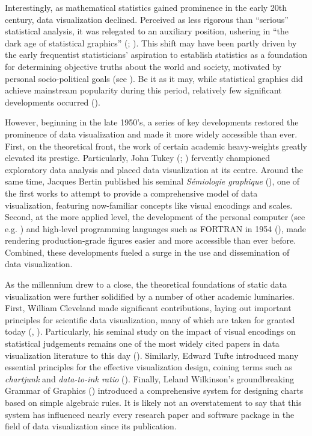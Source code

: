 \documentclass[
  openany]{book}
\theoremstyle{definition}
\theoremstyle{definition}
\theoremstyle{definition}
\theoremstyle{definition}
\theoremstyle{remark}
\begin{document}
Interestingly, as mathematical statistics gained prominence in the early 20th century, data visualization declined. Perceived as less rigorous than ``serious'' statistical analysis, it was relegated to an auxiliary position, ushering in ``the dark age of statistical graphics'' (; ). This shift may have been partly driven by the early frequentist statisticians' aspiration to establish statistics as a foundation for determining objective truths about the world and society, motivated by personal socio-political goals (see ). Be it as it may, while statistical graphics did achieve mainstream popularity during this period, relatively few significant developments occurred ().

However, beginning in the late 1950's, a series of key developments restored the prominence of data visualization and made it more widely accessible than ever. First, on the theoretical front, the work of certain academic heavy-weights greatly elevated its prestige. Particularly, John Tukey (; ) fervently championed exploratory data analysis and placed data visualization at its centre. Around the same time, Jacques Bertin published his seminal \emph{Sémiologie graphique} (), one of the first works to attempt to provide a comprehensive model of data visualization, featuring now-familiar concepts like visual encodings and scales. Second, at the more applied level, the development of the personal computer (see e.g. ) and high-level programming languages such as FORTRAN in 1954 (), made rendering production-grade figures easier and more accessible than ever before. Combined, these developments fueled a surge in the use and dissemination of data visualization.

As the millennium drew to a close, the theoretical foundations of static data visualization were further solidified by a number of other academic luminaries. First, William Cleveland made significant contributions, laying out important principles for scientific data visualization, many of which are taken for granted today (, ). Particularly, his seminal study on the impact of visual encodings on statistical judgements remains one of the most widely cited papers in data visualization literature to this day (). Similarly, Edward Tufte introduced many essential principles for the effective visualization design, coining terms such as \emph{chartjunk} and \emph{data-to-ink ratio} (). Finally, Leland Wilkinson's groundbreaking Grammar of Graphics () introduced a comprehensive system for designing charts based on simple algebraic rules. It is likely not an overstatement to say that this system has influenced nearly every research paper and software package in the field of data visualization since its publication.
\end{document}
